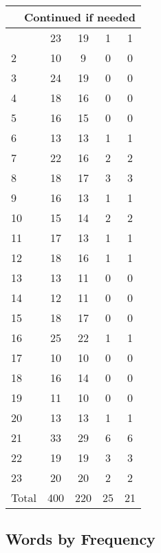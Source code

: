 \begin{center}
\begin{longtable}{l|c|c|c|c}
\hline \multicolumn{5}{|r|}{{Continued if needed}} \\ \hline
\endfoot 
1 & 23 & 19 & 1 & 1\\ \hline
2 & 10 & 9 & 0 & 0\\ \hline
3 & 24 & 19 & 0 & 0\\ \hline
4 & 18 & 16 & 0 & 0\\ \hline
5 & 16 & 15 & 0 & 0\\ \hline
6 & 13 & 13 & 1 & 1\\ \hline
7 & 22 & 16 & 2 & 2\\ \hline
8 & 18 & 17 & 3 & 3\\ \hline
9 & 16 & 13 & 1 & 1\\ \hline
10 & 15 & 14 & 2 & 2\\ \hline
11 & 17 & 13 & 1 & 1\\ \hline
12 & 18 & 16 & 1 & 1\\ \hline
13 & 13 & 11 & 0 & 0\\ \hline
14 & 12 & 11 & 0 & 0\\ \hline
15 & 18 & 17 & 0 & 0\\ \hline
16 & 25 & 22 & 1 & 1\\ \hline
17 & 10 & 10 & 0 & 0\\ \hline
18 & 16 & 14 & 0 & 0\\ \hline
19 & 11 & 10 & 0 & 0\\ \hline
20 & 13 & 13 & 1 & 1\\ \hline
21 & 33 & 29 & 6 & 6\\ \hline
22 & 19 & 19 & 3 & 3\\ \hline
23 & 20 & 20 & 2 & 2\\ \hline
\hline \hline
Total & 400 & 220 & 25 & 21



\end{longtable}
\end{center}

 
\subsection{Words by Frequency}


